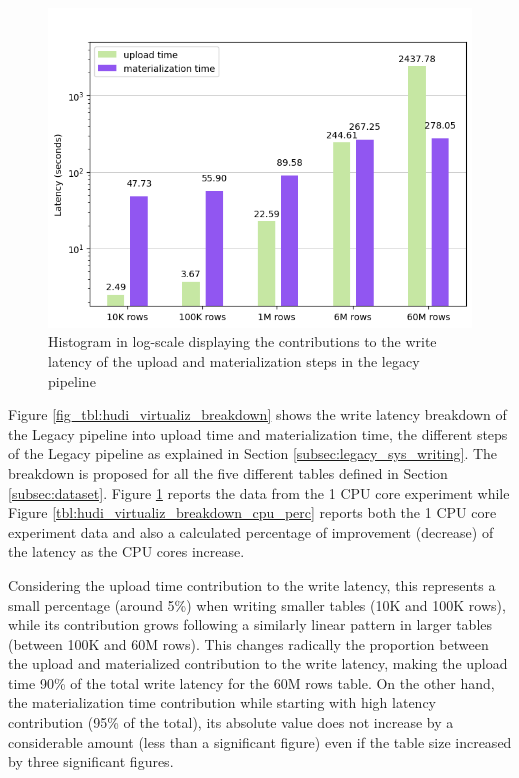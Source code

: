 \begin{figure}
\begin{minipage}[b]{\textwidth}
        \includegraphics[width=\textwidth]{figures/5-results/hudi_virtualiz_1_core.png}
        \caption{Histogram in log-scale displaying the contributions to the write latency of the upload and materialization steps in the legacy pipeline}
        \label{fig:hudi_virtualiz_breakdown}
    \end{minipage}
\end{figure}
Figure \ref{fig_tbl:hudi_virtualiz_breakdown} shows the write latency breakdown of the Legacy pipeline into upload time and materialization time, the different steps of the Legacy pipeline as explained in Section \ref{subsec:legacy_sys_writing}. The breakdown is proposed for all the five different tables defined in Section \ref{subsec:dataset}. Figure \ref{fig:hudi_virtualiz_breakdown} reports the data from the 1 \gls{CPU} core experiment while Figure \ref{tbl:hudi_virtualiz_breakdown_cpu_perc} reports both the 1 \gls{CPU} core experiment data and also a calculated percentage of improvement (decrease) of the latency as the \gls{CPU} cores increase.

Considering the upload time contribution to the write latency, this represents a small percentage (around 5\%) when writing smaller tables (10K and 100K rows), while its contribution grows following a similarly linear pattern in larger tables (between 100K and 60M rows). This changes radically the proportion between the upload and materialized contribution to the write latency, making the upload time 90\% of the total write latency for the 60M rows table. On the other hand, the materialization time contribution while starting with high latency contribution (95\% of the total), its absolute value does not increase by a considerable amount (less than a significant figure) even if the table size increased by three significant figures.

